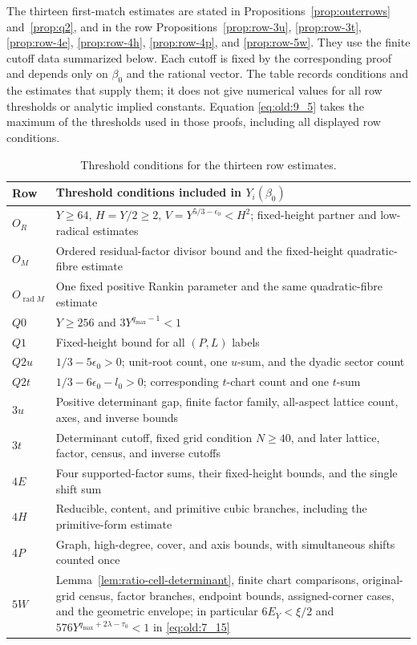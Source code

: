 The thirteen first-match estimates are stated in
Propositions~\ref{prop:outerrows} and~\ref{prop:q2}, and in the row
Propositions~\ref{prop:row-3u}, \ref{prop:row-3t},
\ref{prop:row-4e}, \ref{prop:row-4h}, \ref{prop:row-4p}, and
\ref{prop:row-5w}. They use the finite cutoff data summarized below. Each cutoff is fixed
by the corresponding proof and depends only on \(\beta_0\) and the
rational vector. The table records conditions and the estimates that
supply them; it does not give numerical values for all row thresholds
or analytic implied constants. Equation \eqref{eq:old:9_5} takes the
maximum of the thresholds used in those proofs, including all displayed
row conditions.

\begin{table}[!ht]
\centering
\caption{Threshold conditions for the thirteen row estimates.}
\label{tab:threshold-conditions}
\begin{tabular}{@{}>{\raggedright\arraybackslash}p{}>{\raggedright\arraybackslash}p{}@{}}
Row & Threshold conditions included in $Y_i(\beta_0)$\\ \hline
$O_R$ & $Y\ge64$, $H=Y/2\ge2$, $V=Y^{5/3-\epsilon_0}<H^2$; fixed-height partner and low-radical estimates\\
$O_M$ & Ordered residual-factor divisor bound and the fixed-height quadratic-fibre estimate\\
$O_{\operatorname{rad}M}$ & One fixed positive Rankin parameter and the same quadratic-fibre estimate\\
$Q0$ & $Y\ge256$ and $3Y^{q_{\max}-1}<1$\\
$Q1$ & Fixed-height bound for all $(P,L)$ labels\\
$Q2u$ & $1/3-5\epsilon_0>0$; unit-root count, one $u$-sum, and the dyadic sector count\\
$Q2t$ & $1/3-6\epsilon_0-l_0>0$; corresponding $t$-chart count and one $t$-sum\\
$3u$ & Positive determinant gap, finite factor family, all-aspect lattice count, axes, and inverse bounds\\
$3t$ & Determinant cutoff, fixed grid condition $N\ge40$, and
later lattice, factor, census, and inverse cutoffs\\
$4E$ & Four supported-factor sums, their fixed-height bounds, and the single shift sum\\
$4H$ & Reducible, content, and primitive cubic branches, including the primitive-form estimate\\
$4P$ & Graph, high-degree, cover, and axis bounds, with simultaneous shifts counted once\\
$5W$ & Lemma~\ref{lem:ratio-cell-determinant}, finite chart comparisons,
original-grid census, factor branches, endpoint bounds, assigned-corner
cases, and the geometric envelope; in particular $6E_Y<\xi/2$ and
$576Y^{q_{\max}+2\lambda-\tau_0}<1$ in \eqref{eq:old:7_15}\\
\end{tabular}
\end{table}

